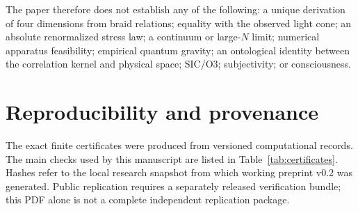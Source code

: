 \documentclass[11pt]{article}
\theoremstyle{definition}
\theoremstyle{remark}
\begin{document}
The paper therefore does not establish any of the following: a unique derivation of four dimensions from braid relations; equality with the observed light cone; an absolute renormalized stress law; a continuum or large-$N$ limit; numerical apparatus feasibility; empirical quantum gravity; an ontological identity between the correlation kernel and physical space; SIC/O3; subjectivity; or consciousness.

\section{Reproducibility and provenance}

The exact finite certificates were produced from versioned computational records. The main checks used by this manuscript are listed in Table~\ref{tab:certificates}. Hashes refer to the local research snapshot from which working preprint v0.2 was generated. Public replication requires a separately released verification bundle; this PDF alone is not a complete independent replication package.
\end{document}

